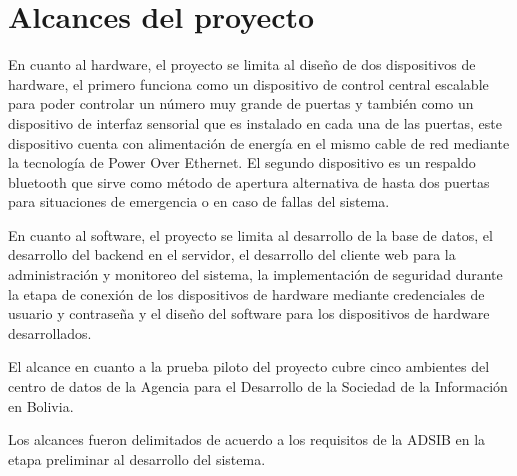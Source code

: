 \documentclass[../principal.tex]{subfiles}
\begin{document}
  \section{Alcances del proyecto}

  En cuanto al hardware, el proyecto se limita al diseño de dos dispositivos de hardware, el primero funciona como un dispositivo de control central escalable para poder controlar un número muy grande de puertas y también como un dispositivo de interfaz sensorial que es instalado en cada una de las puertas, este dispositivo cuenta con alimentación de energía en el mismo cable de red mediante la tecnología de Power Over Ethernet. El segundo dispositivo es un respaldo bluetooth que sirve como método de apertura alternativa de hasta dos puertas para situaciones de emergencia o en caso de fallas del sistema.

  En cuanto al software, el proyecto se limita al desarrollo de la base de datos, el desarrollo del backend en el servidor, el desarrollo del cliente web para la administración y monitoreo del sistema, la implementación de seguridad durante la etapa de conexión de los dispositivos de hardware mediante credenciales de usuario y contraseña y el diseño del software para los dispositivos de hardware desarrollados.

  El alcance en cuanto a la prueba piloto del proyecto cubre cinco ambientes del centro de datos de la Agencia para el Desarrollo de la Sociedad de la Información en Bolivia.

  Los alcances fueron delimitados de acuerdo a los requisitos de la ADSIB en la etapa preliminar al desarrollo del sistema.

  \bibliografia
\end{document}
